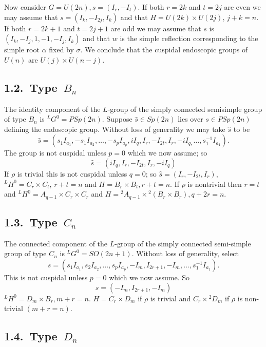 \documentclass{memo-l}
\theoremstyle{definition}
\theoremstyle{remark}
\numberwithin{section}{chapter}
\numberwithin{equation}{chapter}
\begin{document}
   Now consider $G = U(2n), s = (I_{r},-I_{t})$.  If both $r = 2k$ and $t = 2j$ are
even we may assume that $s = (I_{k},-I_{2j},I_{k})$ and that $H = U(2k)\times U(2j)$,
 $j+k = n$.  If both $r = 2k+1$ and $t = 2j+1$ are odd we may assume that $s$ is
$(I_{k},-I_{j},1,-1,-I_{j},I_{k})$ and that $w$ is the simple reflection
corresponding to the simple root ${\alpha}$ fixed by ${\sigma}$.  We
conclude that the cuspidal endoscopic groups of $U(n)$ are $U(j)\times
U(n-j)$.


\subsection{{1.2.\ Type\ $B_n$}}


   The identity component of the $L$-group of the simply connected
semisimple group of type $B_{n}$ is ${}^{L}G^{0}  =  PSp(2n)$.  Suppose  $\hat s
 \in  Sp(2n)$ lies over $s  \in  PSp(2n)$ defining the endoscopic group.
Without loss of generality we may take $\hat s $ to be 
$$
\hat s = (s_{1}I_{a_1} ,-s_{1}I_{a_{2}},\ldots,-s_{p}I_{a_p}, 
iI_{q},I_{r},-I_{2t},I_{r},-iI_{q,}\ldots ,s_{1}^{-1}I_{a_1} ).
$$
The group is not cuspidal unless $p = 0$ which we now assume; so $$\hat s  = 
(iI_{q},I_{r},-I_{2t},I_{r},-iI_{q})$$  If ${\rho }$ is trivial this is not
cuspidal unless $q = 0$; so $\hat s  = (I_{r},-I_{2t},I_{r})$,\ \  ${}^{L}H^{0}  = 
C_{r}\times C_{t}$, $r+t = n$ and $H = B_{r}\times B_{t}, r+t = n$.  
If ${\rho }$ is nontrivial then $r = t$ and ${}^{L}H^{0}  =  
A_{q-1}\times C_{r}\times C_{r}$ and $H  =  {}^{2}A_{q-1}
\times {}^{2}(B_{r}\times B_{r}), q+2r = n$.

\subsection{{1.3.\  Type\ $C_n$} }

The connected component of the $L$-group of
the simply connected semi-simple group of type $C_{n}$ is ${}^{L}G^{0}  = 
SO(2n+1)$.  Without loss of generality, select 
$$
s = (s_{1}I_{a_{1}}, s_{2}I_{a_2} ,\ldots
,s_{p}I_{a_p},-I_{m},I_{2r+1},-I_{m},\ldots ,s_{1}^{-1}I_{a_1}).
$$
This is not cuspidal unless $p = 0$ which we now assume.  So
$$s = (-I_{m},I_{2r+1},-I_{m})$$  ${}^{L}H^{0} = D_{m}\times B_{r}, m+r = n$.
$H = C_{r}\times D_{m}$ if ${\rho }$ is trivial and $C_{r}\times {}^{2}D_{m}$ if ${\rho }$
is non-trivial $(m+r = n)$.

\subsection{{1.4.\ Type\ $D_n$}}
\end{document}
